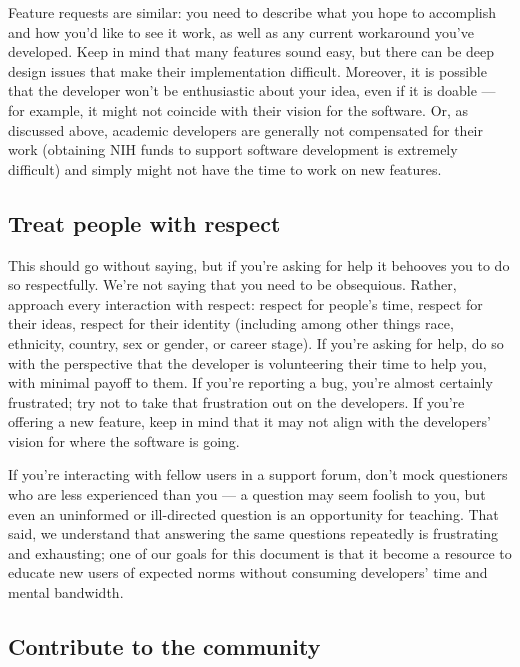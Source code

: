 \documentclass[9pt,training]{livecoms}
\begin{document}
Feature requests are similar: you need to describe what you hope to accomplish
and how you'd like to see it work, as well as any current workaround you've
developed. Keep in mind that many features sound easy, but there can be deep
design issues that make their implementation difficult. Moreover, it is possible
that the developer won't be enthusiastic about your idea, even if it is doable
--- for example, it might not coincide with their vision for the software. Or,
as discussed above, academic developers are generally not compensated for their
work (obtaining NIH funds to support software development is extremely
difficult) and simply might not have the time to work on new features.

\subsection{Treat people with respect}

This should go without saying, but if you're asking for help it behooves you to
do so respectfully. We're not saying that you need to be obsequious. Rather,
approach every interaction with respect: respect for people's time, respect for
their ideas, respect for their identity (including among other things race,
ethnicity, country, sex or gender, or career stage). If you're asking for help,
do so with the perspective that the developer is volunteering their time to help
you, with minimal payoff to them.  If you're reporting a bug, you're almost
certainly frustrated; try not to take that frustration out on the developers. If
you're offering a new feature, keep in mind that it may not align with the
developers' vision for where the software is going.

If you're interacting with fellow users in a support forum, don't mock
questioners who are less experienced than you --- a question may seem foolish to
you, but even an uninformed or ill-directed question is an opportunity for
teaching. That said, we understand that answering the same questions repeatedly
is frustrating and exhausting; one of our goals for this document is that it
become a resource to educate new users of expected norms without consuming
developers' time and mental bandwidth.

\subsection{Contribute to the community}
\end{document}

